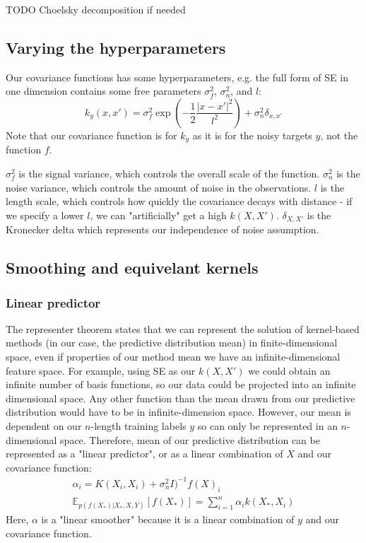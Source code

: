 \documentclass[10pt]{article}
\begin{document}
TODO Choelsky decomposition if needed


\subsection{Varying the hyperparameters \cite{gp-ml}}
Our covariance functions has some hyperparameters, e.g. the full form of SE in one dimension contains some free parameters $\sigma^2_f$, $\sigma^2_n$, and $l$:
\begin{equation*}
    k_y(x,x') = \sigma^2_f \exp\left(-\frac{1}{2}\frac{|x - x'|^2}{l^2}\right) + \sigma^2_n\delta_{x,x'}
\end{equation*}
Note that our covariance function is for $k_y$ as it is for the noisy targets $y$, not the function $f$.

$\sigma^2_f$ is the signal variance, which controls the overall scale of the function. $\sigma^2_n$ is the noise variance, which controls the amount of noise in the observations. $l$ is the length scale, which controls how quickly the covariance decays with distance - if we specify a lower $l$, we can "artificially" get a high $k(X,X')$. $\delta_{X,X'}$ is the Kronecker delta which represents our independence of noise assumption.


\subsection{Smoothing and equivelant kernels \cite{gp-ml}}

\subsubsection{Linear predictor}
The representer theorem states that we can represent the solution of kernel-based methods (in our case, the predictive distribution mean) in finite-dimensional space, even if properties of our method mean we have an infinite-dimensional feature space. For example, using SE as our $k(X, X')$ we could obtain an infinite number of basis functions, so our data could be projected into an infinite dimensional space. Any other function than the mean drawn from our predictive distribution would have to be in infinite-dimension space. However, our mean is dependent on our $n$-length training labels $y$ so can only be represented in an $n$-dimensional space. Therefore, mean of our predictive distribution can be represented as a "linear predictor", or as a linear combination of $X$ and our covariance function:
\begin{equation} \label{eq:gp_linear_predictor}
    \begin{aligned}
        \alpha_i = K(X_i, X_i) + \sigma_n^2I)^{-1}f(X)_i \\
        \mathbb{E}_{p(f(X_*)|X_*,X,Y)}[f(X_*)] = \sum_{i=1}^n \alpha_i k(X_*, X_i)
    \end{aligned}
\end{equation}
Here, $\alpha$ is a "linear smoother" because it is a linear combination of $y$ and our covariance function.
\end{document}
